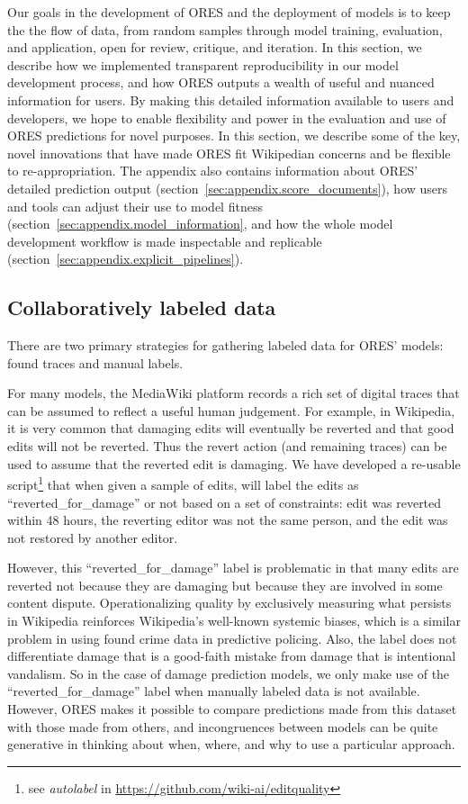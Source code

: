 Our goals in the development of ORES and the deployment of models is to keep the the flow of data, from random samples through model training, evaluation, and application, open for review, critique, and iteration.  In this section, we describe how we implemented transparent reproducibility in our model development process, and how ORES outputs a wealth of useful and nuanced information for users.  By making this detailed information available to users and developers, we hope to enable flexibility and power in the evaluation and use of ORES predictions for novel purposes.  In this section, we describe some of the key, novel innovations that have made ORES fit Wikipedian concerns and be flexible to re-appropriation.  The appendix also contains information about ORES' detailed prediction output (section~\ref{sec:appendix.score_documents}), how users and tools can adjust their use to model fitness (section~\ref{sec:appendix.model_information}, and how the whole model development workflow is made inspectable and replicable (section~\ref{sec:appendix.explicit_pipelines}).

\subsection{Collaboratively labeled data}
There are two primary strategies for gathering labeled data for ORES' models: found traces and manual labels.

 For many models, the MediaWiki platform records a rich set of digital traces that can be assumed to reflect a useful human judgement.  For example, in Wikipedia, it is very common that damaging edits will eventually be reverted and that good edits will not be reverted.  Thus the revert action (and remaining traces) can be used to assume that the reverted edit is damaging.  We have developed a re-usable script\footnote{see \emph{autolabel} in \url{https://github.com/wiki-ai/editquality}} that when given a sample of edits, will label the edits as ``reverted\_for\_damage'' or not based on a set of constraints: edit was reverted within 48 hours, the reverting editor was not the same person, and the edit was not restored by another editor.

However, this ``reverted\_for\_damage'' label is problematic in that many edits are reverted not because they are damaging but because they are involved in some content dispute.  Operationalizing quality by exclusively measuring what persists in Wikipedia reinforces Wikipedia's well-known systemic biases, which is a similar problem in using found crime data in predictive policing.  Also, the label does not differentiate damage that is a good-faith mistake from damage that is intentional vandalism.  So in the case of damage prediction models, we only make use of the ``reverted\_for\_damage'' label when manually labeled data is not available.  However, ORES makes it possible to compare predictions made from this dataset with those made from others, and incongruences between models can be quite generative in thinking about when, where, and why to use a particular approach.


